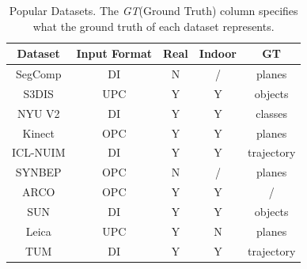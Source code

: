 \documentclass[main.tex]{subfiles}
\begin{document}
\begin{table}[]
    \centering
    \begin{tabular}{c|cccc}
        Dataset                                                                                                          & Input Format & Real & Indoor & GT         \\ \hline
        SegComp      \cite{article}                                                                                      & DI  & N    & /      & planes     \\
        S3DIS   \cite{armeni_cvpr16}                                                                                     & UPC    & Y    & Y      & objects    \\
        NYU V2  \cite{10.1007/978-3-642-33715-4_54}                                                                      & DI  & Y    & Y      & classes    \\
        Kinect  \cite{Oehler_efficientmulti-resolution}                                                                  & OPC    & Y    & Y      & planes     \\
        ICL-NUIM       \cite{handa:etal:ICRA2014}                                                                        & DI  & Y    & Y      & trajectory \\
        SYNBEP         \cite{schaefer19icra}                                                                             & OPC    & N    & /      & planes     \\
        ARCO          \cite{Hidalgo-Paniagua_Vega-Rodríguez_Pavón_Ferruz_2015}                                           & OPC    & Y    & Y      & /          \\
        SUN                    \cite{7298655}                                                                            & DI  & Y    & Y      & objects    \\
        Leica          \cite{leica}   & UPC    & Y    & N      & planes     \\
        TUM              \cite{sturm12iros}                                                                              & DI  & Y    & Y      & trajectory
    \end{tabular}
    \caption[Popular Datasets]{Popular Datasets. The \textit{GT}(Ground Truth) column specifies what the ground truth of each dataset represents.}
    \label{tab:datasets}
\end{table}
\end{document}
